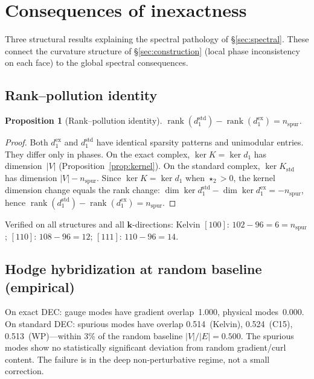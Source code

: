 \documentclass[12pt]{article}
\newtheorem{proposition}[theorem]{Proposition}
\theoremstyle{definition}
\theoremstyle{remark}
\newcommand{\kk}{\mathbf{k}}
\DeclareMathOperator{\rank}{rank}
\DeclareMathOperator{\cker}{ker}
\begin{document}
\section{Consequences of inexactness}
\label{sec:inexactness}

Three structural results explaining the spectral pathology of
\S\ref{sec:spectral}. These connect the curvature structure of
\S\ref{sec:construction} (local phase inconsistency on each face) to the
global spectral consequences.

\subsection{Rank--pollution identity}

\begin{proposition}[Rank--pollution identity]\label{prop:rank}
$\rank(d_1^{\mathrm{std}}) - \rank(d_1^{\mathrm{ex}}) = n_{\mathrm{spur}}$.
\end{proposition}

\begin{proof}
Both $d_1^{\mathrm{ex}}$ and $d_1^{\mathrm{std}}$ have identical sparsity
patterns and unimodular entries. They differ only in phases. On the exact
complex, $\cker K = \cker d_1$ has dimension~$|V|$
(Proposition~\ref{prop:kernel}). On the standard complex, $\cker K_{\mathrm{std}}$
has dimension $|V| - n_{\mathrm{spur}}$. Since $\cker K = \cker d_1$ when
$\star_2 > 0$, the kernel dimension change equals the rank change:
$\dim\cker d_1^{\mathrm{std}} - \dim\cker d_1^{\mathrm{ex}} = -n_{\mathrm{spur}}$,
hence $\rank(d_1^{\mathrm{std}}) - \rank(d_1^{\mathrm{ex}}) = n_{\mathrm{spur}}$.
\end{proof}

Verified on all structures and all $\kk$-directions:
Kelvin $[100]$: $102 - 96 = 6 = n_{\mathrm{spur}}$;
$[110]$: $108 - 96 = 12$;
$[111]$: $110 - 96 = 14$.

\subsection{Hodge hybridization at random baseline (empirical)}

On exact DEC: gauge modes have gradient overlap~1.000, physical modes~0.000.
On standard DEC: spurious modes have overlap 0.514~(Kelvin), 0.524~(C15),
0.513~(WP)---within 3\% of the random baseline $|V|/|E| = 0.500$. The
spurious modes show no statistically significant deviation from random
gradient/curl content. The failure is in the deep non-perturbative regime,
not a small correction.
\end{document}
